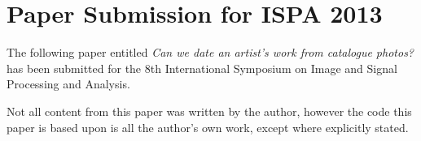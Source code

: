 \chapter{Paper Submission for ISPA 2013}\label{sec:paper}

The following paper entitled \emph{Can we date an artist's work from catalogue photos?}\cite{Brown2013Can} has been 
submitted for the 8th International Symposium on Image and Signal Processing and Analysis.

Not all content from this paper was written by the author, however the code this paper is based upon is all the author's
own work, except where explicitly stated.



